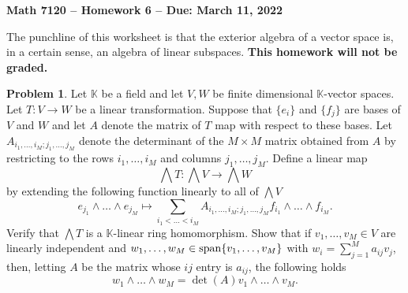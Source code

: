 \documentclass[letterpaper,11pt]{amsart}
\theoremstyle{plain}
\theoremstyle{definition}
\newtheorem{defn}[thm]{Definition}
\newtheorem{pr}[thm]{Problem}
\theoremstyle{remark}
\begin{document}
\Large

\begin{center}
{\bf Math 7120 -- Homework  6 --  Due:  March 11, 2022}
\end{center}

\normalsize

\medskip


The punchline of this worksheet is that the exterior algebra of a vector space is, in a certain sense, an algebra of linear subspaces. {\bf This homework will not be graded.}


\begin{pr}
    Let $\mathbb{K}$ be a field and let
    $V,W$ be finite dimensional $\mathbb{K}$-vector spaces.
    Let $T: V \rightarrow W$ be a linear transformation.
    Suppose that $\{e_i\}$ and $\{f_j\}$ are bases of $V$ and $W$
    and let $A$ denote the matrix of $T$ map with respect to these bases.
    Let $A_{i_1,\dots,i_M;j_1,\dots,j_M}$ denote the determinant of the $M\times M$ matrix obtained from $A$ by restricting to the rows $i_1,\dots,i_M$ and columns $j_1,\dots,j_M$.
    Define a linear map
    \[
        \bigwedge T : \bigwedge V \rightarrow \bigwedge W
    \]
    by extending the following function linearly to all of $\bigwedge V$
    \[
        e_{j_1}\wedge \dots \wedge e_{j_M} \mapsto \sum_{i_1 < \dots < i_M} A_{i_1,\dots,i_M;j_1,\dots,j_M} f_{i_1}\wedge \dots \wedge f_{i_M}.
    \]
    Verify that $\bigwedge T$ is a $\mathbb{K}$-linear ring homomorphism.
    Show that if $v_1,\dots,v_M \in V$ are linearly independent and $w_1,\dots,w_M \in {\rm span}\{v_1,\dots,v_M\}$ with $w_i = \sum_{j=1}^M a_{ij}v_j$, then, letting $A$ be the matrix whose $ij$ entry is $a_{ij}$, the following holds
        \[
            w_1\wedge\dots\wedge w_M = \det(A) v_1 \wedge \dots \wedge v_M.
        \]
\end{pr}
\end{document}

